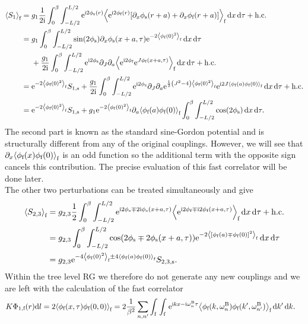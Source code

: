 \documentclass[english, parskip=full]{scrartcl}
\begin{document}
\begin{align}
\bra*{S_1}_\f &= g_1 \frac{1}{2\i} \intx{0}{\beta}{\intx{-L/2}{L/2}{\powe{\i 2\phi_\s(r)} \bra*{\powe{\i 2\phi_\f(r)} \klb*{\partial_x \phi_\s(r+a) + \partial_x\phi_\f(r+a)}}_\f}{x}}{\tau} + \hc\\
&= \bsplit{&g_1 \intx{0}{\beta}{\intx{-L/2}{L/2}{\sin(2\phi_\s)\partial_x\phi_\s(x+a,\tau) \powe{-2\bra*{\phi_\f(0)^2}_\f}}{x}}{\tau}\\
&+\frac{g_1}{2\i} \intx{0}{\beta}{\intx{-L/2}{L/2}{ \powe{\i 2\phi_\s} \partial_J \partial_a \bra*{\powe{\i 2\phi_\f} \powe{J\phi_\f(x+a,\tau)}}_\f }{x}}{\tau} + \hc}\\
&= \powe{-2\bra*{\phi_\f(0)^2}_\f} S_{1,\s} + \frac{g_1}{2\i} \intx{0}{\beta}{\intx{-L/2}{L/2}{\powe{\i 2\phi_\s} \partial_J \partial_a \powe{\frac{1}{2} \kla*{J^2 - 4} \bra*{\phi_\f(0)^2}_\f} \powe{\i 2J\bra*{\phi_\f(a) \phi_\f(0)}_\f}}{x}}{\tau} + \hc\\
&= \powe{-2\bra*{\phi_\f(0)^2}_\f} S_{1,\s} + g_1 \powe{-2 \bra*{\phi_\f(0)^2}_\f} \partial_a \bra*{\phi_\f(a) \phi_\f(0)}_\f \intx{0}{\beta}{\intx{-L/2}{L/2}{\cos\kla*{2\phi_\s}}{x}}{\tau}.
\end{align}
The second part is known as the standard sine-Gordon potential and is structurally different from any of the original couplings.
However, we will see that $\partial_x\bra*{\phi_\f(x) \phi_\f(0)}_\f$ is an odd function so the additional term with the opposite sign cancels this contribution.
The precise evaluation of this fast correlator will be done later.\\
The other two perturbations can be treated simultaneously and give
\begin{align}
\bra*{S_{2,3}}_\f &= g_{2,3} \frac{1}{2} \intx{0}{\beta}{\intx{-L/2}{L/2}{\powe{\i 2\phi_\s \mp 2\i \phi_\s(x+a,\tau)} \bra*{\powe{\i 2\phi_\f \mp \i 2\phi_\f(x+a,\tau)}}_\f}{x}}{\tau} + \hc\\
&= g_{2,3} \intx{0}{\beta}{\intx{-L/2}{L/2}{\cos\kla*{2\phi_\s \mp 2\phi_\s(x+a,\tau)} \powe{-2 \bra*{\klb*{\phi_\f(a) \mp \phi_\f(0)}^2}_\f}}{x}}{\tau}\\
&= g_{2,3} \powe{-4 \bra*{\phi_\f(0)^2}_\f \pm 4 \bra*{\phi_\f(a)\phi_\f(0)}_\f} S_{2,3,\s}.
\end{align}
Within the tree level RG we therefore do not generate any new couplings and we are left with the calculation of the fast correlator
\begin{align}
K\Phi_{1,\f}(r) \d l &= 2\bra*{\phi_\f(x,\tau)\phi_\f(0,0)}_\f = 2\frac{1}{\beta^2} \sum_{n,n'} \intx{\f}{ }{\intx{\f}{ }{ \powe{\i kx-\i\omega_n^\B\tau} \bra*{\phi_\f(k,\omega_n^\B) \phi_\f(k',\omega_{n'}^\B)}_\f }{k'}}{k}.
\end{align}
\end{document}
